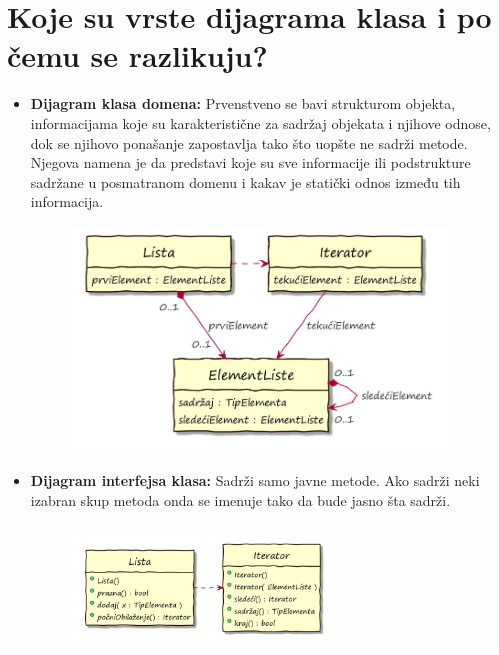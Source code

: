 \documentclass[a4paper]{article}
\begin{document}
\section {Koje su vrste dijagrama klasa i po čemu se razlikuju?}
  \begin{itemize}
    \item \textbf{Dijagram klasa domena:} Prvenstveno se bavi strukturom objekta, informacijama koje su karakteristične za sadržaj objekata i njihove odnose, dok se njihovo ponašanje zapostavlja tako što uopšte ne sadrži metode. Njegova namena je da predstavi koje su sve informacije ili podstrukture sadržane u posmatranom domenu i kakav je statički odnos između tih informacija.

  \begin{figure}[H]
    \begin{center}
        \includegraphics[width=100mm,height=60mm]{Slike/dijagram-klasa-domena.png}
    \end{center}
  \end{figure} 


    \item \textbf{Dijagram interfejsa klasa:} Sadrži samo javne metode. Ako sadrži neki izabran skup metoda onda se imenuje tako da bude jasno šta sadrži.

  \begin{figure}[H]
    \begin{center}
        \includegraphics[width=70mm,height=35mm]{Slike/dijagram-interfejsa.png}
    \end{center}
  \end{figure} 


\end{itemize}
\end{document}
